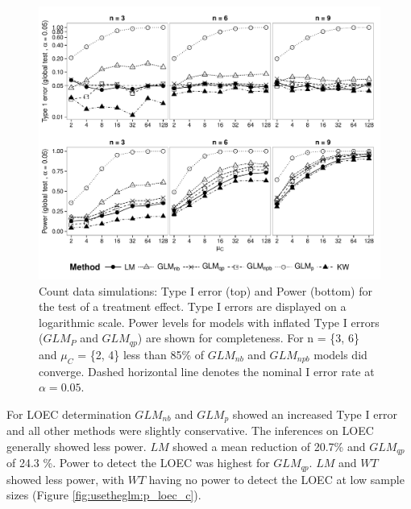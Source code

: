 \begin{figure}
  \centering
  \includegraphics[width = \textwidth]{chapters/usetheglm/p_glob_c.pdf}
  \caption[Count data simulations: Type I error and Power for the test of a treatment effect.]{Count data simulations: Type I error (top) and Power (bottom) for the test of a treatment effect.
  Type I errors are displayed on a logarithmic scale.
  Power levels for models with inflated Type I errors ($GLM_P$ and $GLM_{qp}$) are shown for completeness.
  For n = \{3, 6\} and $\mu_C$ = \{2, 4\} less than 85\% of $GLM_{nb}$ and $GLM_{npb}$ models did converge.
  Dashed horizontal line denotes the nominal I error rate at $\alpha = 0.05$.
  }
  \label{fig:usetheglm:p_glob_c}
\end{figure}

For LOEC determination $GLM_{nb}$ and $GLM_{p}$ showed an increased Type I error and all other methods were slightly conservative.
The inferences on LOEC generally showed less power.
$LM$ showed a mean reduction of 20.7\% and $GLM_{qp}$ of 24.3 \%.
Power to detect the LOEC was highest for $GLM_{qp}$. 
$LM$ and $WT$ showed less power, with $WT$ having no power to detect the LOEC at low sample sizes (Figure \ref{fig:usetheglm:p_loec_c}).

